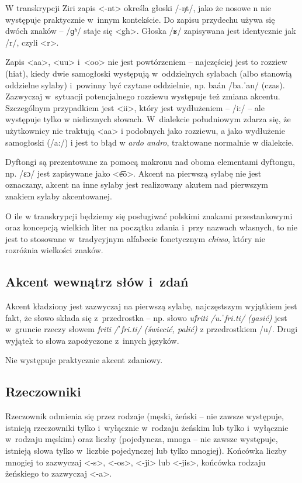 \begin{spacing}{1.1}
W transkrypcji Ziri zapis <-nt> określa głoski /-ŋt/, jako że nosowe n nie 
występuje praktycznie w~innym kontekście. Do zapisu przydechu używa się dwóch 
znaków -- /ɡʱ/ staje się <gh>. Głoska /ʁ/ zapisywana jest identycznie jak /r/, 
czyli <r>.

\skipline

Zapis <aa>, <uu> i~<oo> nie jest powtórzeniem -- najczęściej jest to rozziew
(hiat), kiedy dwie samogłoski występują w~oddzielnych sylabach (albo stanowią
oddzielne sylaby) i~powinny być czytane oddzielnie, np. baán /ba.ˈan/ (czas).
Zazwyczaj w~sytuacji potencjalnego rozziewu występuje też zmiana akcentu.
Szczególnym przypadkiem jest <ii>, który jest wydłużeniem -- /i:/ -- ale
występuje tylko w nielicznych słowach. W~dialekcie południowym zdarza się, że
użytkownicy nie traktują <aa> i podobnych jako rozziewu, a jako wydłużenie
samogłoski (/a:/) i jest to błąd w \emph{ardo andro}, traktowane normalnie w
dialekcie.

Dyftongi są prezentowane za pomocą makronu nad oboma elementami dyftongu, np.
/ɛɔ/ jest zapisywane jako <e͞o>. Akcent na pierwszą sylabę nie jest oznaczany, 
akcent na inne sylaby jest realizowany akutem nad pierwszym znakiem sylaby 
akcentowanej.

O ile w transkrypcji będziemy się posługiwać polskimi znakami przestankowymi
oraz koncepcją wielkich liter na początku zdania i~przy nazwach własnych, to nie
jest to stosowane w~tradycyjnym alfabecie fonetycznym \emph{chiwo}, który nie
rozróżnia wielkości znaków.

\subsection{Akcent wewnątrz słów i~zdań}

Akcent kładziony jest zazwyczaj na pierwszą sylabę, najczęstszym wyjątkiem jest
fakt, że słowo składa się z~przedrostka -- np. słowo \emph{uf́riti /u.ˈfri.ti/
(gasić)} jest w~gruncie rzeczy słowem \emph{friti /ˈfri.ti/ (świecić, palić)} z
przedrostkiem /u/. Drugi wyjątek to słowa zapożyczone z~innych języków.

Nie występuje praktycznie akcent zdaniowy.

\subsection{Rzeczowniki}
Rzeczownik odmienia się przez rodzaje (męski, żeński -- nie zawsze występuje,
istnieją rzeczowniki tylko i~wyłącznie w~rodzaju żeńskim lub tylko i~wyłącznie
w~rodzaju męskim) oraz liczby (pojedyncza, mnoga -- nie zawsze występuje,
istnieją słowa tylko w~liczbie pojedynczej lub tylko mnogiej). Końcówka liczby
mnogiej to zazwyczaj <-s>, <-os>, <-ji> lub <-jis>, końcówka rodzaju żeńskiego
to zazwyczaj <-a>.


\end{spacing}
